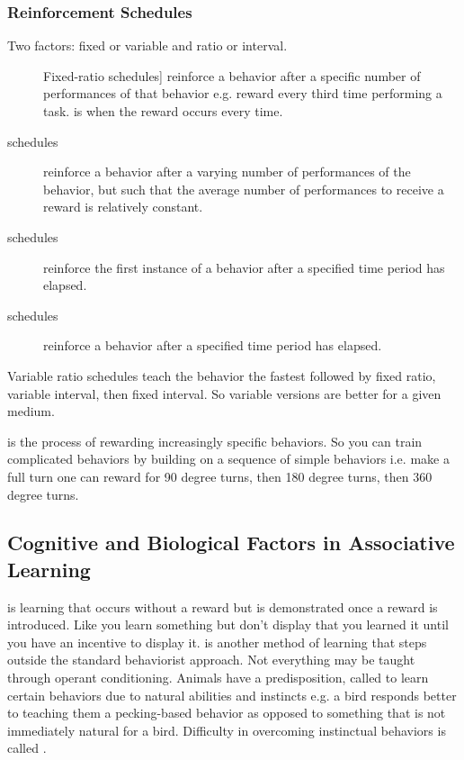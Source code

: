 \documentclass[../Psych_Soci_review.tex]{subfiles}
\begin{document}
\subsubsection{Reinforcement Schedules}
Two factors: fixed or variable and ratio or interval.
\begin{description}
  \item[\vocab]{Fixed-ratio} schedules] reinforce a behavior after a specific
    number of performances of that behavior e.g. reward every third time
    performing a task.   is when the reward
    occurs every time.
  \item[ schedules] reinforce a behavior after a varying
    number of performances of the behavior, but such that the average number of
    performances to receive a reward is relatively constant.
  \item[ schedules] reinforce the first instance of a
    behavior after a specified time period has elapsed. 
  \item[ schedules] reinforce a behavior after a
    specified time period has elapsed. 
\end{description}
Variable ratio schedules teach the behavior the fastest followed by fixed ratio,
variable interval, then fixed interval. So variable versions are better for a
given medium.

 is the process of rewarding increasingly specific behaviors.
So you can train complicated behaviors by building on a sequence of simple
behaviors i.e. make a full turn one can reward for 90 degree turns, then 180
degree turns, then 360 degree turns.

\subsection{Cognitive and Biological Factors in Associative Learning}

 is learning that occurs without a reward but is
demonstrated once a reward is introduced.  Like you learn something but don't
display that you learned it until you have an incentive to display it.
 is another method of learning that steps outside the
standard behaviorist approach.  Not everything may be taught through operant
conditioning.  Animals have a predisposition, called  to
learn certain behaviors due to natural abilities and instincts e.g. a bird
responds better to teaching them a pecking-based behavior as opposed to something
that is not immediately natural for a bird. Difficulty in overcoming instinctual
behaviors is called . 
\newpage
\end{document}
